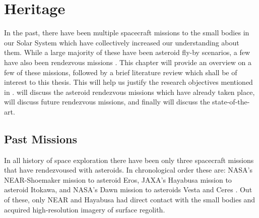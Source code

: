 \chapter{Heritage}
\label{chap:heritage}
\graphicspath{{Mission_Heritage/Images/}}

In the past, there have been multiple spacecraft missions to the small bodies in our Solar System which have collectively increased our understanding about them. While a large majority of these have been asteroid fly-by scenarios, a few have also been rendezvous missions \parencite{esa_mission2asteroids_web}. This chapter will provide an overview on a few of these missions, followed by a brief literature review which shall be of interest to this thesis. This will help us justify the research objectives mentioned in .  will discuss the asteroid rendezvous missions which have already taken place,  will discuss future rendezvous missions, and finally  will discuss the state-of-the-art.

\section{Past Missions}
\label{sec:past_missions}
In all history of space exploration there have been only three spacecraft missions that have rendezvoused with asteroids. In chronological order these are: \gls{NASA}'s \gls{NEAR}-Shoemaker mission to asteroid Eros, \gls{JAXA}'s Hayabusa mission to asteroid Itokawa, and \gls{NASA}'s Dawn mission to asteroids Vesta and Ceres \parencite{scheeresBook}. Out of these, only \gls{NEAR} and Hayabusa had direct contact with the small bodies and acquired high-resolution imagery of surface regolith.

